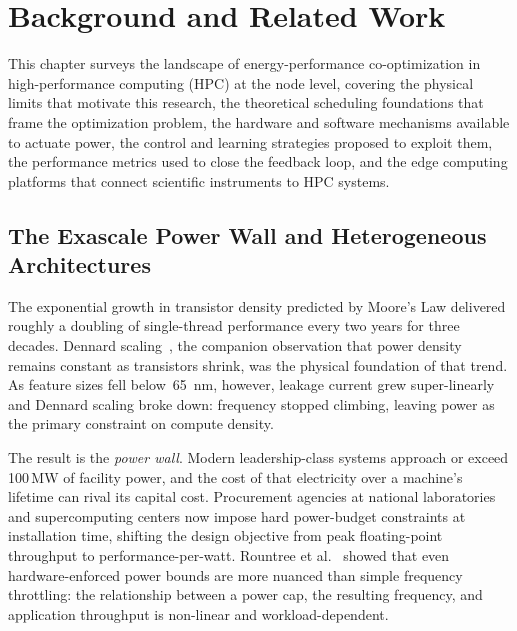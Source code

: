 
\chapter{Background and Related Work} \label{CH2_LiteratureReview}

\normalsize\doublespacing

This chapter surveys the landscape of energy-performance co-optimization in high-performance
computing (HPC) at the node level, covering the physical limits that motivate this research,
the theoretical scheduling foundations that frame the optimization problem, the hardware
and software mechanisms available to actuate power, the control and learning strategies
proposed to exploit them, the performance metrics used to close the feedback loop, and
the edge computing platforms that connect scientific instruments to HPC systems.

\section{The Exascale Power Wall and Heterogeneous Architectures}

The exponential growth in transistor density predicted by Moore's Law delivered roughly
a doubling of single-thread performance every two years for three decades.
Dennard scaling~\cite{Dennard1974}, the companion observation that power density remains
constant as transistors shrink, was the physical foundation of that trend.
As feature sizes fell below~\SI{65}{\nano\meter}, however, leakage current grew super-linearly
and Dennard scaling broke down: frequency stopped climbing, leaving power as the primary
constraint on compute density.

The result is the \emph{power wall}.  Modern leadership-class systems approach or exceed
100\,MW of facility power, and the cost of that electricity over a machine's lifetime can
rival its capital cost.  Procurement agencies at national laboratories and supercomputing
centers now impose hard power-budget constraints at installation time, shifting the design
objective from peak floating-point throughput to performance-per-watt.
Rountree et al.~\cite{rountree2012beyond} showed that even hardware-enforced power bounds
are more nuanced than simple frequency throttling: the relationship between a power cap, the
resulting frequency, and application throughput is non-linear and workload-dependent.

